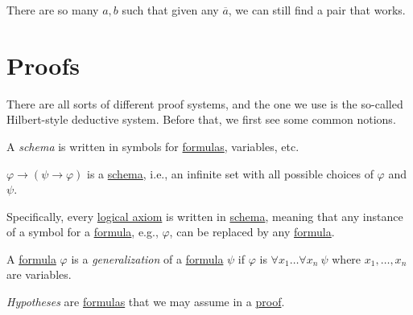 \begin{intuition}
	There are so many \(a, b\) such that given any \(\overline{a} \), we can still find a pair that works.
\end{intuition}

\section{Proofs}
There are all sorts of different proof systems, and the one we use is the so-called Hilbert-style deductive system. Before that, we first see some common notions.

\begin{notation}[Schema]\label{not:schema}
	A \emph{schema} is written in symbols for \hyperref[def:formula]{formulas}, variables, etc.
\end{notation}

\begin{eg}
	\(\varphi \to (\psi \to  \varphi )\) is a \hyperref[not:schema]{schema}, i.e., an infinite set with all possible choices of \(\varphi \) and \(\psi \).
\end{eg}

Specifically, every \hyperref[def:logical-axioms]{logical axiom} is written in \hyperref[not:schema]{schema}, meaning that any instance of a symbol for a \hyperref[def:formula]{formula}, e.g., \(\varphi \), can be replaced by any \hyperref[def:formula]{formula}.

\begin{definition}[Generalization]\label{def:generalization}
	A \hyperref[def:formula]{formula} \(\varphi \) is a \emph{generalization} of a \hyperref[def:formula]{formula} \(\psi \) if \(\varphi \) is \(\forall x_1 \dots \forall x_n\ \psi \) where \(x_1, \dots , x_n\) are variables.
\end{definition}

\begin{notation}[Hypothesis]\label{not:hypothesis}
	\emph{Hypotheses} are \hyperref[def:formula]{formulas} that we may assume in a \hyperref[def:proof]{proof}.
\end{notation}

